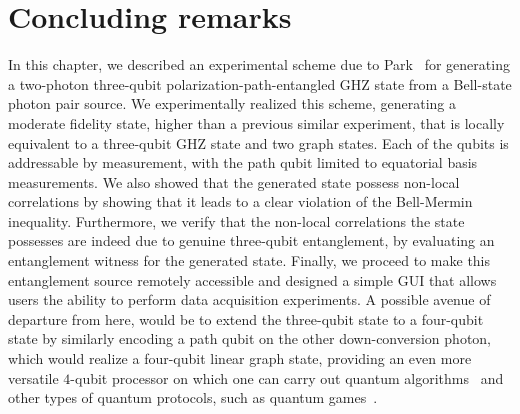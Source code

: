 \clearpage

\section{Concluding remarks}
In this chapter, we described an experimental scheme due to Park~\etal\cite{Park_2007} for generating a two-photon three-qubit polarization-path-entangled \acs{GHZ} state from a Bell-state photon pair source. We experimentally realized this scheme, generating a moderate fidelity state, higher than a previous similar experiment, that is locally equivalent to a three-qubit \acs{GHZ} state and two graph states. Each of the qubits is addressable by measurement, with the path qubit limited to equatorial basis measurements. We also showed that the generated state possess non-local correlations by showing that it leads to a clear violation of the Bell-Mermin inequality. Furthermore, we verify that the non-local correlations the state possesses are indeed due to genuine three-qubit entanglement, by evaluating an entanglement witness for the generated state. Finally, we proceed to make this entanglement source remotely accessible and designed a simple GUI that allows users the ability to perform data acquisition experiments. A possible avenue of departure from here, would be to extend the three-qubit state to a four-qubit state by similarly encoding a path qubit on the other down-conversion photon, which would realize a four-qubit linear graph state, providing an even more versatile $4$-qubit processor on which one can carry out quantum algorithms~\cite{Chen_2007} and other types of quantum protocols, such as quantum games~\cite{Schmid_2010}.



